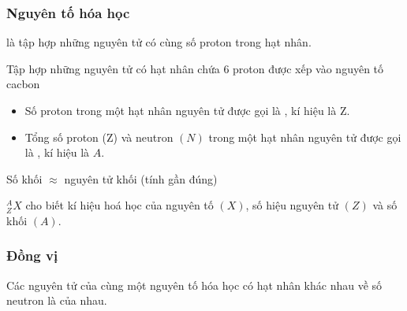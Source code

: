 \subsubsection{Nguyên tố hóa học}
\begin{kngsnd}
	 là tập hợp những nguyên tử có cùng số proton trong hạt nhân.
\end{kngsnd}
Tập hợp những nguyên tử có hạt nhân chứa 6 proton được xếp vào nguyên tố cacbon
\begin{kngsnd}
	\begin{itemize}
	\item Số proton trong một hạt nhân nguyên tử được gọi là , kí hiệu là Z.
	\item Tổng số proton (Z) và neutron $(N)$ trong một hạt nhân nguyên tử được gọi là , kí hiệu là $A$.
	\end{itemize}
 \centering{}
\end{kngsnd}
\begin{note}
\end{note}
\begin{notegsnd}
Số khối	$  \approx  $ nguyên tử khối (tính gần đúng)
\end{notegsnd}
\begin{kngsnd}
	 ${ }_Z^A X$ cho biết kí hiệu hoá học của nguyên tố $(X)$, số hiệu nguyên tử $(Z)$ và số khối $(A)$.
\end{kngsnd}

\subsubsection{Đồng vị}
\begin{kngsnd}
	Các nguyên tử của cùng một nguyên tố hóa học có hạt nhân khác nhau về số neutron là  của nhau.
\end{kngsnd}
